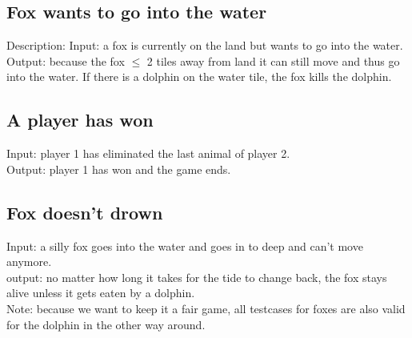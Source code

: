 \documentclass[a4paper,11pt]{article}
\begin{document}
    \subsection{Fox wants to go into the water}
    Description: 
    Input: a fox is currently on the land but wants to go into the water.\\
    Output: because the fox $\leq$ 2 tiles away from land it can still move and thus go into the water. If there is a dolphin on the water tile, the fox kills the dolphin.\\

    \subsection{A player has won}
    Input: player 1 has eliminated the last animal of player 2.\\
    Output: player 1 has won and the game ends.\\

    \subsection{Fox doesn't drown}
    Input: a silly fox goes into the water and goes in to deep and can't move anymore.\\
    output: no matter how long it takes for the tide to change back, the fox stays alive unless it gets eaten by a dolphin.\\


    Note: because we want to keep it a fair game, all testcases for foxes are also valid for the dolphin in the other way around.\\
\end{document}
